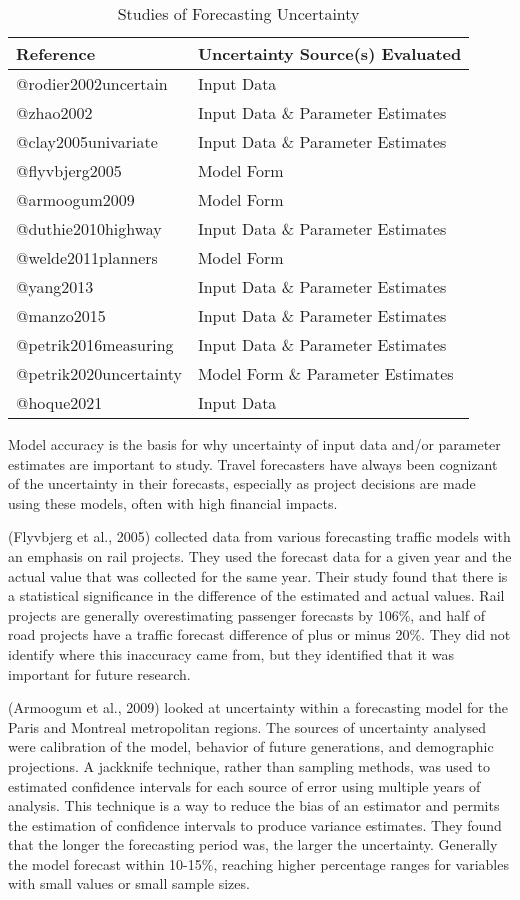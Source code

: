 \documentclass[
  letterpaper,
  number,
  review,
  3p]{elsarticle}
\begin{document}
\begin{longtable}[t]{ll}

\caption{\label{tbl-authors}Studies of Forecasting Uncertainty}

\tabularnewline

\toprule
Reference & Uncertainty Source(s) Evaluated\\
\midrule
@rodier2002uncertain & Input Data\\
@zhao2002 & Input Data \& Parameter Estimates\\
@clay2005univariate & Input Data \& Parameter Estimates\\
@flyvbjerg2005 & Model Form\\
@armoogum2009 & Model Form\\
\addlinespace
@duthie2010highway & Input Data \& Parameter Estimates\\
@welde2011planners & Model Form\\
@yang2013 & Input Data \& Parameter Estimates\\
@manzo2015 & Input Data \& Parameter Estimates\\
@petrik2016measuring & Input Data \& Parameter Estimates\\
\addlinespace
@petrik2020uncertainty & Model Form \& Parameter Estimates\\
@hoque2021 & Input Data\\
\bottomrule

\end{longtable}

Model accuracy is the basis for why uncertainty of input data and/or
parameter estimates are important to study. Travel forecasters have
always been cognizant of the uncertainty in their forecasts, especially
as project decisions are made using these models, often with high
financial impacts.

(Flyvbjerg et al., 2005) collected data from various forecasting traffic
models with an emphasis on rail projects. They used the forecast data
for a given year and the actual value that was collected for the same
year. Their study found that there is a statistical significance in the
difference of the estimated and actual values. Rail projects are
generally overestimating passenger forecasts by 106\%, and half of road
projects have a traffic forecast difference of plus or minus 20\%. They
did not identify where this inaccuracy came from, but they identified
that it was important for future research.

(Armoogum et al., 2009) looked at uncertainty within a forecasting model
for the Paris and Montreal metropolitan regions. The sources of
uncertainty analysed were calibration of the model, behavior of future
generations, and demographic projections. A jackknife technique, rather
than sampling methods, was used to estimated confidence intervals for
each source of error using multiple years of analysis. This technique is
a way to reduce the bias of an estimator and permits the estimation of
confidence intervals to produce variance estimates. They found that the
longer the forecasting period was, the larger the uncertainty. Generally
the model forecast within 10-15\%, reaching higher percentage ranges for
variables with small values or small sample sizes.
\end{document}
